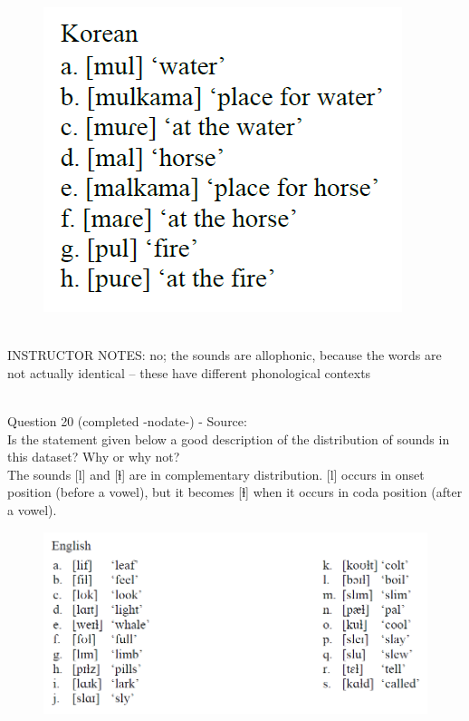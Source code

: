 \documentclass[12pt]{article}
\begin{document}
\begin{figure}[H]
\includegraphics{../images/korean.png}
\end{figure}

~\\
INSTRUCTOR NOTES: no; the sounds are allophonic, because the words are not actually identical -- these have different phonological contexts


~\\

{\large Question 20} (completed -nodate-) - Source: \\

Is the statement given below a good description of the distribution of sounds in this dataset? Why or why not?\\

The sounds {[l]} and {[ɫ]} are in complementary distribution. {[l]} occurs in onset position (before a vowel), but it becomes {[ɫ]} when it occurs in coda position (after a vowel).

\begin{figure}[H]
\includegraphics{../images/english_laterals.png}
\end{figure}
\end{document}
